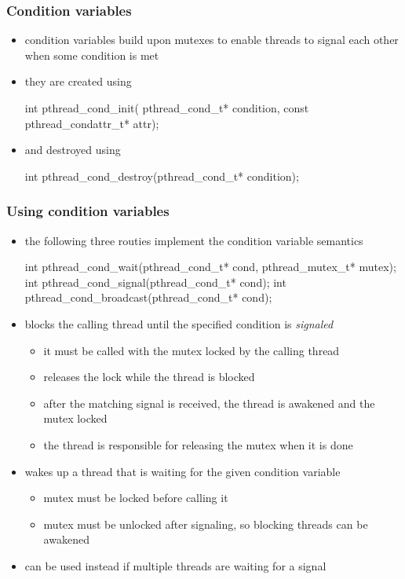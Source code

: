 \begin{frame}[fragile]
%
  \frametitle{Condition variables}
%
  \begin{itemize}
%
  \item condition variables build upon mutexes to enable threads to signal each other when some
    condition is met
%
  \item they are created using
%
    \begin{C}
int pthread_cond_init(
    pthread_cond_t* condition, const pthread_condattr_t* attr);
    \end{C}
%
  \item and destroyed using
%
    \begin{C}
int pthread_cond_destroy(pthread_cond_t* condition);
    \end{C}
%
  \end{itemize}
%
\end{frame}

\begin{frame}[fragile]
%
  \frametitle{Using condition variables}
%
  \begin{itemize}
%
  \item the following three routies implement the condition variable semantics
%
    \begin{C}
int pthread_cond_wait(pthread_cond_t* cond, pthread_mutex_t* mutex);
int pthread_cond_signal(pthread_cond_t* cond);
int pthread_cond_broadcast(pthread_cond_t* cond);
    \end{C}
%
  \item {} blocks the calling thread until the specified
    condition is {\em signaled}
    \begin{itemize}
    \item it must be called with the mutex locked by the calling thread
    \item {} releases the lock while the thread is blocked
    \item after the matching signal is received, the thread is awakened and the mutex locked
    \item the thread is responsible for releasing the mutex when it is done
    \end{itemize}
%
  \item {} wakes up a thread that is waiting for the given
    condition variable
    \begin{itemize}
    \item mutex must be locked before calling it
    \item mutex must be unlocked after signaling, so blocking threads can be awakened
    \end{itemize}
%
  \item {} can be used instead if multiple threads are
    waiting for a signal
%
  \end{itemize}
%
\end{frame}

